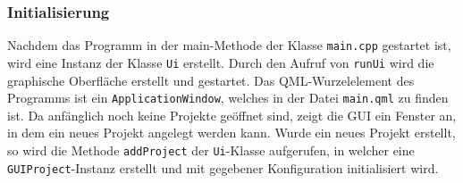 \subsubsection{Initialisierung}

 Nachdem das Programm in der
main-Methode der Klasse \texttt{main.cpp} gestartet ist, wird eine Instanz der
Klasse \texttt{Ui} erstellt. Durch den Aufruf von \texttt{runUi} wird die
graphische Oberfläche erstellt und gestartet. Das QML-Wurzelelement des
Programms ist ein \texttt{ApplicationWindow}, welches in der Datei
\texttt{main.qml} zu finden ist. Da anfänglich noch keine Projekte geöffnet
sind, zeigt die GUI ein Fenster an, in dem ein neues Projekt angelegt werden
kann. Wurde ein neues Projekt erstellt, so wird die Methode \texttt{addProject}
der \texttt{Ui}-Klasse aufgerufen, in welcher eine \texttt{GUIProject}-Instanz
erstellt und mit gegebener Konfiguration initialisiert wird.
